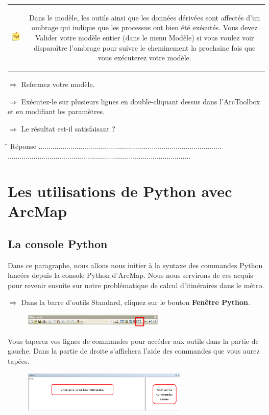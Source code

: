 \documentclass[11pt]{article}
\newcommand{\action}{$\Rightarrow$ }
\newcommand{\reponse}{
	\begin{tabbing}
	\hspace{2cm}\=\kill
	Réponse \> ............................................................................................ \\
 	\> ............................................................................................
	\end{tabbing}
}
\newenvironment{note}{%
	\begin{tabular}[t t]{c c}
		\includegraphics{img/tips.png}
		 &
		\begin{minipage}[c]{0.9\linewidth}
			\begin{sffamily}
}{%
			\end{sffamily}
		\end{minipage}
	\end{tabular}
}
\begin{document}
\begin{note}
Dans le modèle, les outils ainsi que les données dérivées sont affectés d'un ombrage qui indique que les processus ont bien été exécutés. Vous devez Valider votre modèle entier (dans le menu Modèle) si vous voulez voir disparaître l'ombrage pour suivre le cheminement la prochaine fois que vous exécuterez votre modèle.
\end{note}

\action Refermez votre modèle.

\action Exécutez-le sur plusieurs lignes en double-cliquant dessus dans l'ArcToolbox et en modifiant les paramètres.

\action Le résultat est-il satisfaisant ?

\reponse



\section{Les utilisations de Python avec ArcMap}

\subsection{La console Python}
Dans ce paragraphe, nous allons nous initier à la syntaxe des commandes Python lancées depuis la console Python d'ArcMap. Nous nous servirons de ces acquis pour revenir ensuite sur notre problématique de calcul d'itinéraires dans le métro.

\action Dans la barre d'outils Standard, cliquez sur le bouton \textbf{Fenêtre Python}.
\begin{figure}[H]
	\center \includegraphics[width=0.6\textwidth]{img/td3/python_bouton.png}\\
\end{figure}

Vous taperez vos lignes de commandes pour accéder aux outils dans la partie de gauche. Dans la partie de droite s'affichera l'aide des commandes que vous aurez tapées.
\begin{figure}[H]
	\center \includegraphics[width=0.7\textwidth]{img/td3/python_console.png}\\
\end{figure}
\end{document}
